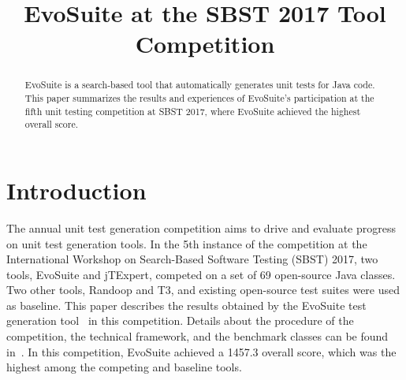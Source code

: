 \documentclass[10pt,conference]{IEEEtran}
\newcommand{\EVOSUITE}{{\sc EvoSuite}\xspace}
\newcommand{\JTEXPERT}{{\sc jTExpert}\xspace}
\newcommand{\RANDOOP}{{\sc Randoop}\xspace}
\newcommand{\TT}{{\sc T3}\xspace}
\begin{document}
% 

\title{EvoSuite at the SBST 2017 Tool Competition}
 

\author{
\and
{}
}

\maketitle

\begin{abstract}
  \EVOSUITE is a search-based tool that automatically generates unit
  tests for Java code.  This paper summarizes the results and
  experiences of \EVOSUITE's participation at the fifth unit testing
  competition at SBST 2017, where \EVOSUITE achieved the highest
  overall score.
\end{abstract}



\section{Introduction}
The annual unit test generation competition aims to drive and evaluate
progress on unit test generation tools. In the 5th instance of the
competition at the International Workshop on Search-Based Software
Testing (SBST) 2017, two tools, \EVOSUITE and \JTEXPERT, competed on a
set of 69 open-source Java classes. Two other tools, \RANDOOP and \TT,
and existing open-source test suites were used as baseline. This paper
describes the results obtained by the \EVOSUITE test generation
tool~\cite{FrA11c} in this competition. Details about the procedure of
the competition, the technical framework, and the benchmark classes
can be found in~\cite{sbst17competition}.  In this competition,
\EVOSUITE achieved a 1457.3 overall score, which was the highest among
the competing and baseline tools.
\end{document}
